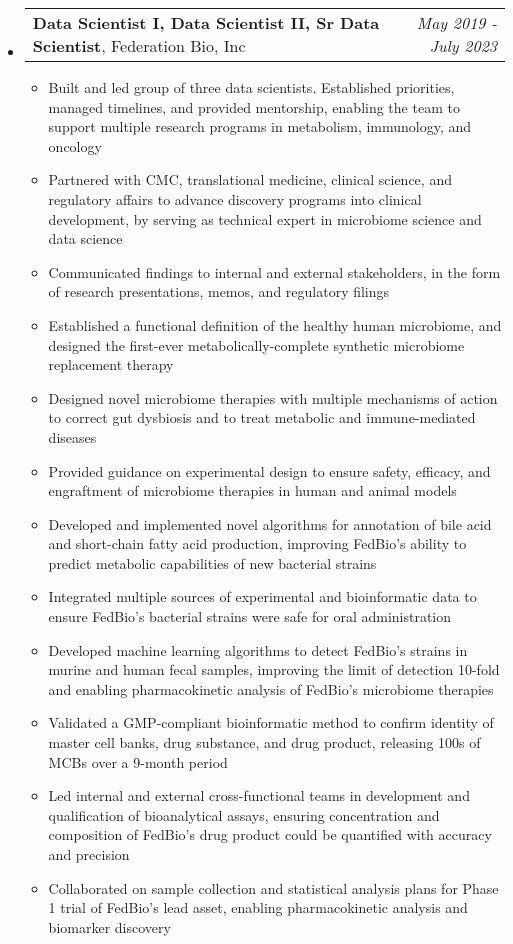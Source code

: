 \documentclass[letterpaper,10pt]{article}
\makeatletter
\newlength{\outerbordwidth}
\newcommand{\resheading}[1]{\vspace{8pt}
  \parbox{\textwidth}{
  \setlength{\FrameSep}{\outerbordwidth}
\setlength{\fboxsep}{0pt}
\framebox[\textwidth][l]{\setlength{\fboxsep}{4pt}\fcolorbox{shadecolorB}{shadecolorB}{\textbf{\sffamily{\mbox{~}\makebox[7.262in][l]{\large #1} \vphantom{p\^{E}}}}}}
  }
  \vspace{-5pt}
}
\newcommand{\ressubheadingSingular}[2]{
\begin{tabular*}{7in}{l@{\cftdotfill{\cftsecdotsep}\extracolsep{\fill}}r}
		#1 & \textit{#2} \\
\end{tabular*}\vspace{-6pt}}
\makeatother
\begin{document}
\resheading{Experience}
\begin{itemize}
	\item
		\ressubheadingSingular{\textbf{Data Scientist I, Data Scientist II, Sr Data Scientist}, Federation Bio, Inc}{May 2019 - July 2023}
		\begin{itemize}
		
			\item Built and led group of three data scientists. Established priorities, managed timelines, and provided mentorship, enabling the team to support multiple research programs in metabolism, immunology, and oncology
			\item Partnered with CMC, translational medicine, clinical science, and regulatory affairs to advance discovery programs into clinical development, by serving as technical expert in microbiome science and data science
			\item Communicated findings to internal and external stakeholders, in the form of research presentations, memos, and regulatory filings

			\item Established a functional definition of the healthy human microbiome, and designed the first-ever metabolically-complete synthetic microbiome replacement therapy
			\item Designed novel microbiome therapies with multiple mechanisms of action to correct gut dysbiosis and to treat metabolic and immune-mediated diseases
			\item Provided guidance on experimental design to ensure safety, efficacy, and engraftment of microbiome therapies in human and animal models
			\item Developed and implemented novel algorithms for annotation of bile acid and short-chain fatty acid production, improving FedBio's ability to predict metabolic capabilities of new bacterial strains
			\item Integrated multiple sources of experimental and bioinformatic data to ensure FedBio's bacterial strains were safe for oral administration
			\item Developed machine learning algorithms to detect FedBio's strains in murine and human fecal samples, improving the limit of detection 10-fold and enabling pharmacokinetic analysis of FedBio's microbiome therapies
			\item Validated a GMP-compliant bioinformatic method to confirm identity of master cell banks, drug substance, and drug product, releasing 100s of MCBs over a 9-month period
			\item Led internal and external cross-functional teams in development and qualification of bioanalytical assays, ensuring concentration and composition of FedBio's drug product could be quantified with accuracy and precision
			\item Collaborated on sample collection and statistical analysis plans for Phase 1 trial of FedBio's lead asset, enabling pharmacokinetic analysis and biomarker discovery
			

\end{itemize}
\end{itemize}
\end{document}
